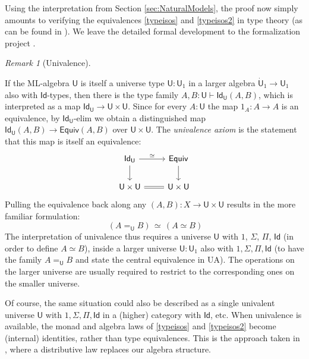 \documentclass[12pt,reqno]{amsart}
\renewcommand{\to}{\ensuremath{\rightarrow}}
\newcommand{\Id}{\mathsf{Id}}
\newcommand{\T}{\ensuremath{\mathsf{U}}}
\newcommand{\TT}{\ensuremath{\dot{\mathsf{U}}}}
\theoremstyle{remark}
\newtheorem{remark}[theorem]{Remark}
\theoremstyle{definition}
\begin{document}
Using the interpretation from Section \ref{sec:NaturalModels}, the proof now simply amounts to verifying the equivalences \eqref{typeisos} and \eqref{typeisos2}  in type theory (as can be found in \cite[Chapter 2]{HoTTbook}).  We leave the detailed formal development to the formalization project \cite{HoTTLean}.
  
\begin{remark}[Univalence]\label{remark:univalence}

If the ML-algebra $\T$ is itself a universe type $\T : \T_1$ in a larger algebra $\TT_1 \to \T_1$ also with $\Id{}$-types, then there is the type family $A, B: \T \vdash \Id_{\T}(A,B)$, which is interpreted as a map $\Id_{\T}\to \T \times \T$.  Since for every $A:\T$ the map $1_A : A \to A$ is an equivalence, by $\Id_{\T}$-elim we obtain a distinguished map  $\Id_{\T}(A, B) \to \mathsf{Equiv}(A, B)$ over $\T \times \T$.  The \emph{univalence axiom} is the statement that this map is itself an equivalence:
\begin{equation}\label{diag:univalence4}
\begin{tikzcd} 
\Id_{\T} \ar[d] \ar[r, "{\simeq}"] & \mathsf{Equiv} \ar[d] \\  
 \T \times \T  \ar[r, equals] & \T \times \T
	 \end{tikzcd}
 \end{equation}
 Pulling the equivalence back along any $(A, B) : X \to \T \times \T$ results in the more familiar formulation:
 \[\tag{UA}
 \ (A =_\T B) \, \simeq\, (A \simeq B)
 \]
The interpretation of univalence thus requires a universe $\T$ with $1$, $\Sigma$, $\Pi$, $\Id{}$ (in order to define $A\simeq B$), inside a larger universe $\T:\T_1$ also with $1, \Sigma, \Pi, \Id{}$ (to have the family $A =_\T B$ and state the central equivalence in UA). The operations on the larger universe are usually required to restrict to the corresponding ones on the smaller universe.   

Of course, the same situation could also be described as a single univalent universe $\T$ with $1, \Sigma, \Pi, \Id{}$ in a (higher) category with $\Id{}$, etc.  When univalence is available, the monad and algebra laws of \eqref{typeisos} and \eqref{typeisos2}  become (internal) identities, rather than type equivalences.  This is the approach taken in \cite{AberleSpivak:2024}, where a distributive law replaces our algebra structure.
\end{remark}
\end{document}
